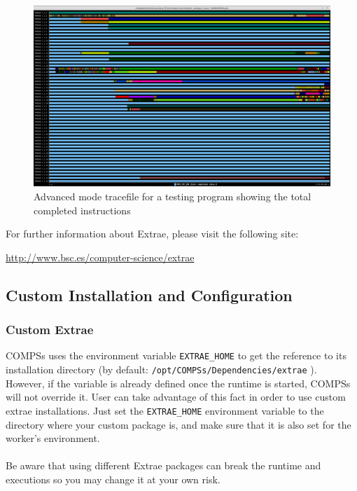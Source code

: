 \begin{landscape}
\begin{figure}[ht!]
  \centering
    \includegraphics[width=\linewidth]{./Sections/2_Execution/Figures/advanced.png}
    \caption{Advanced mode tracefile for a testing program showing the total completed instructions}
    \label{fig:advanced_trace}
\end{figure}
\end{landscape}

For further information about Extrae, please visit the following site: 
\begin{center}
\url{http://www.bsc.es/computer-science/extrae} 
\end{center}


\subsection{Custom Installation and Configuration}


\subsubsection{Custom Extrae}

COMPSs uses the environment variable \verb|EXTRAE_HOME| to get the reference to its installation directory (by default:
\verb|/opt/COMPSs/Dependencies/extrae| ). However, if the variable is already defined once the runtime is started, COMPSs
will not override it. User can take advantage of this fact in order to use custom extrae installations. Just set the
\verb|EXTRAE_HOME| environment variable to the directory where your custom package is, and make sure that it is also
set for the worker's environment. 
\\
\\
Be aware that using different Extrae packages can break the runtime and executions so you may change it at your own risk.


